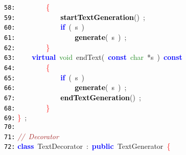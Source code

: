 \documentclass{article}
\begin{document}
\mbox{}\texttt{\textcolor{Black}{58:}} \ \ \ \ \ \ \ \ \textcolor{Red}{\{} \\
\mbox{}\texttt{\textcolor{Black}{59:}} \ \ \ \ \ \ \ \ \ \ \ \ \textbf{\textcolor{Black}{startTextGeneration}}\textcolor{BrickRed}{()}\ \textcolor{BrickRed}{;} \\
\mbox{}\texttt{\textcolor{Black}{60:}} \ \ \ \ \ \ \ \ \ \ \ \ \textbf{\textcolor{Blue}{if}}\ \textcolor{BrickRed}{(}\ s\ \textcolor{BrickRed}{)} \\
\mbox{}\texttt{\textcolor{Black}{61:}} \ \ \ \ \ \ \ \ \ \ \ \ \ \ \ \ \textbf{\textcolor{Black}{generate}}\textcolor{BrickRed}{(}\ s\ \textcolor{BrickRed}{)}\ \textcolor{BrickRed}{;} \\
\mbox{}\texttt{\textcolor{Black}{62:}} \ \ \ \ \ \ \ \ \textcolor{Red}{\}} \\
\mbox{}\texttt{\textcolor{Black}{63:}} \ \ \ \ \textbf{\textcolor{Blue}{virtual}}\ \textcolor{ForestGreen}{void}\ \label{test.h:63}endText\textcolor{BrickRed}{(}\ \textbf{\textcolor{Blue}{const}}\ \textcolor{ForestGreen}{char}\ \textcolor{BrickRed}{*}s\ \textcolor{BrickRed}{)}\ \textbf{\textcolor{Blue}{const}} \\
\mbox{}\texttt{\textcolor{Black}{64:}} \ \ \ \ \ \ \ \ \textcolor{Red}{\{} \\
\mbox{}\texttt{\textcolor{Black}{65:}} \ \ \ \ \ \ \ \ \ \ \ \ \textbf{\textcolor{Blue}{if}}\ \textcolor{BrickRed}{(}\ s\ \textcolor{BrickRed}{)} \\
\mbox{}\texttt{\textcolor{Black}{66:}} \ \ \ \ \ \ \ \ \ \ \ \ \ \ \ \ \textbf{\textcolor{Black}{generate}}\textcolor{BrickRed}{(}\ s\ \textcolor{BrickRed}{)}\ \textcolor{BrickRed}{;} \\
\mbox{}\texttt{\textcolor{Black}{67:}} \ \ \ \ \ \ \ \ \ \ \ \ \textbf{\textcolor{Black}{endTextGeneration}}\textcolor{BrickRed}{()}\ \textcolor{BrickRed}{;} \\
\mbox{}\texttt{\textcolor{Black}{68:}} \ \ \ \ \ \ \ \ \textcolor{Red}{\}} \\
\mbox{}\texttt{\textcolor{Black}{69:}} \textcolor{Red}{\}}\ \textcolor{BrickRed}{;} \\
\mbox{}\texttt{\textcolor{Black}{70:}}  \\
\mbox{}\texttt{\textcolor{Black}{71:}} \textit{\textcolor{Brown}{//\ Decorator}} \\
\mbox{}\texttt{\textcolor{Black}{72:}} \textbf{\textcolor{Blue}{class}}\ \label{test.h:72}TextDecorator\ \textcolor{BrickRed}{:}\ \textbf{\textcolor{Blue}{public}}\ TextGenerator\ \textcolor{Red}{\{} \\
\end{document}
